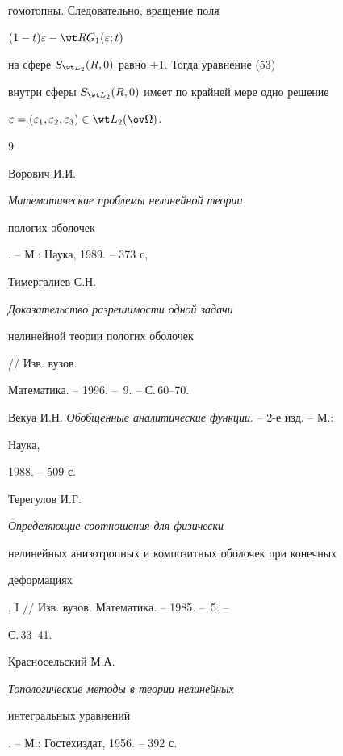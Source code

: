 гомотопны. Следовательно, вращение поля 


$(1-t)\varepsilon-\wt R G_1(\varepsilon;t)$ 


на сфере $S_{\wt L_2}(R,0)$ равно $+1$. Тогда уравнение (53) 


внутри сферы $S_{\wt L_2}(R,0)$ имеет по крайней мере одно решение 


$\varepsilon=(\varepsilon_1,\varepsilon_2,\varepsilon_3)\in 


\wt L_2(\ov\Omega)$. 


 


\begin{thebibliography}{9} 


 




Ворович И.И. {\em Математические проблемы нелинейной теории 


пологих оболочек}. -- М.: Наука, 1989. -- 373 с, 




Тимергалиев С.Н. {\em Доказательство разрешимости одной задачи 


нелинейной теории пологих оболочек} // Изв. вузов.  


Математика. -- 1996. -- \No\,9. -- С.\,60--70. 




Векуа И.Н. {\em Обобщенные аналитические функции}. -- 2-е изд. -- М.: 


Наука, 


1988. -- 509 с. 




Терегулов И.Г. {\em Определяющие соотношения для физически 


нелинейных анизотропных и композитных оболочек при конечных 


деформациях}, I // Изв. вузов. Математика. -- 1985. -- \No\,5. -- 


С.\,33--41. 




Красносельский М.А. {\em Топологические методы в теории нелинейных 


интегральных уравнений}. -- М.: Гостехиздат, 1956. -- 392 с. 


 


\end{thebibliography} 


 


\vskip 2cm 


 








\smallskip 






 


\label{end} 


 


